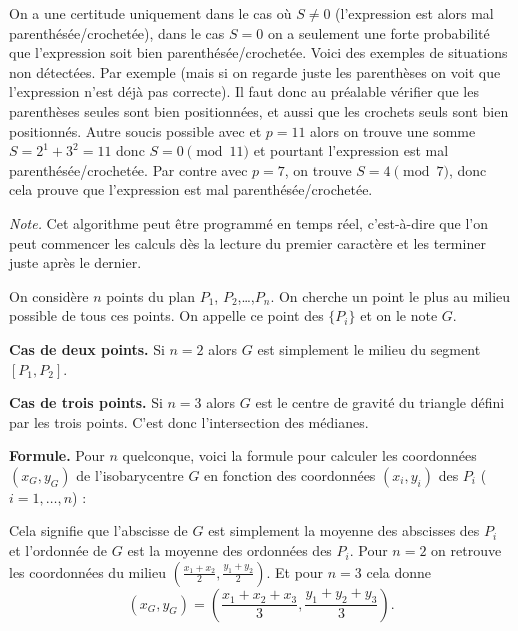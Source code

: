 \documentclass[11pt,class=report,crop=false]{standalone}
\begin{document}
\begin{activite}
On a une certitude uniquement dans le cas où $S\neq0$ (l'expression est alors mal parenthésée/crochetée),
dans le cas $S=0$ on a seulement une forte probabilité que l'expression soit bien parenthésée/crochetée.
Voici des exemples de situations non détectées. Par exemple  (mais si on regarde juste les parenthèses on voit que l'expression n'est déjà pas correcte). Il faut donc au préalable vérifier que les parenthèses seules sont bien positionnées, et aussi que les crochets seuls sont bien positionnés. 
Autre soucis possible avec \ci{"(["} et $p=11$ alors on trouve une somme $S=2^1+3^2=11$ donc 
$S=0 \pmod{11}$ et pourtant l'expression est mal parenthésée/crochetée.
Par contre avec $p=7$, on trouve $S=4 \pmod{7}$, donc cela prouve que l'expression est mal parenthésée/crochetée.

\emph{Note.} Cet algorithme peut être programmé en temps réel, c'est-à-dire que l'on peut commencer les calculs dès la lecture du premier caractère et les terminer juste après le dernier.
\end{activite}





\begin{cours}[Isobarycentre]


On considère $n$ points du plan $P_1$, $P_2$,\ldots,$P_n$.
On cherche un point \og{}le plus au milieu possible\fg{} de tous ces points. On appelle ce point  des $\{P_i\}$ et on le note $G$.


\textbf{Cas de deux points.} Si $n=2$ alors
	$G$ est simplement le milieu du segment $[P_1,P_2]$.
	
\textbf{Cas de trois points.} Si $n=3$ alors
$G$ est le centre de gravité du triangle défini par les trois points. C'est donc l'intersection des médianes.	
	

	

	
\textbf{Formule.}
Pour $n$ quelconque, voici la formule pour calculer les coordonnées $(x_G,y_G)$ de l'isobarycentre $G$ en fonction des coordonnées $(x_i,y_i)$ des $P_i$ ($i=1,\ldots,n$) :




Cela signifie que l'abscisse de $G$ est simplement la moyenne des abscisses des $P_i$ et l'ordonnée de $G$ est la moyenne des ordonnées des $P_i$.
Pour $n=2$ on retrouve les coordonnées du milieu $\left(\frac{x_1+x_2}{2}, \frac{y_1+y_2}{2}\right)$. Et pour $n=3$ cela donne 
$$(x_G,y_G) = \left(\frac{x_1+x_2+x_3}{3},\frac{y_1+y_2+y_3}{3}\right).$$

\end{cours}
\end{document}
